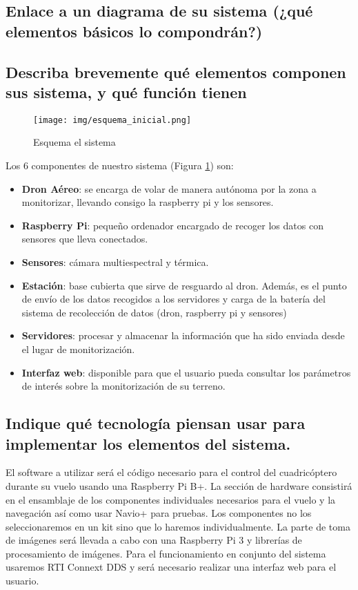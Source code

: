 \documentclass[11pt,spanish]{article} %
\begin{document}
\subsection{Enlace a un diagrama de su sistema (¿qué elementos básicos lo compondrán?)} 

\subsection{Describa brevemente qué elementos componen sus sistema, y qué función tienen}

\begin{figure}[H]
	\centering
	\texttt{[image: img/esquema\_inicial.png]}
	\caption{Esquema el sistema}
	\label{fig:esquema_inicial}
\end{figure}

Los 6 componentes de nuestro sistema (Figura \ref{fig:esquema_inicial}) son:
\begin{itemize}
\item \textbf{Dron Aéreo}: se encarga de volar de manera autónoma por la zona a monitorizar, llevando consigo la raspberry pi y los sensores.

\item \textbf{Raspberry Pi}: pequeño ordenador encargado de recoger los datos con sensores que lleva conectados.

\item \textbf{Sensores}: cámara multiespectral y térmica. 

\item \textbf{Estación}: base cubierta que sirve de resguardo al dron. Además, es el punto de envío de los datos recogidos a los servidores y carga de la batería del sistema de recolección de datos (dron, raspberry pi  y sensores)

\item \textbf{Servidores}: procesar y almacenar la información que ha sido enviada desde el lugar de monitorización.

\item \textbf{Interfaz web}: disponible para que el usuario pueda consultar los parámetros de interés sobre la monitorización de su terreno.
\end{itemize}

\subsection{Indique qué tecnología piensan usar para implementar los elementos del sistema.}
El software a utilizar será el código necesario para el control del cuadricóptero durante su vuelo usando una Raspberry Pi B+. La sección de hardware consistirá en el ensamblaje de los componentes individuales necesarios para el vuelo y la navegación así como usar Navio+ para pruebas. Los componentes no los seleccionaremos en un kit sino que lo haremos individualmente. La parte de toma de imágenes será llevada a cabo con una Raspberry Pi 3 y librerías de procesamiento de imágenes. Para el funcionamiento en conjunto del sistema usaremos RTI Connext DDS y será necesario realizar una interfaz web para el usuario.
\end{document}
